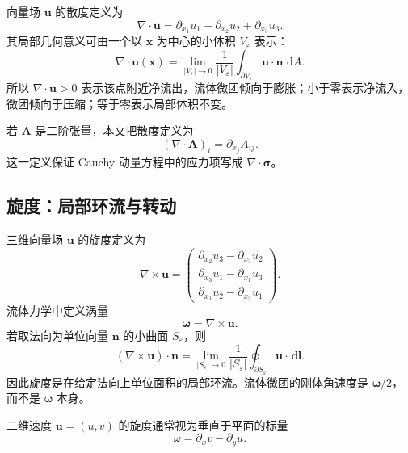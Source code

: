 \documentclass[cn,hazy,blue,11pt,normal]{elegantnote}
\numberwithin{equation}{section}
\newcommand{\dd}{\,\mathrm d}
\newcommand{\vct}[1]{\bm{#1}}
\newcommand{\ten}[1]{\bm{#1}}
\begin{document}
向量场 $\vct u$ 的散度定义为
\begin{equation}
 \boxed{\nabla\cdot\vct u
 =\partial_{x_1}u_1+\partial_{x_2}u_2+\partial_{x_3}u_3.}
\end{equation}
其局部几何意义可由一个以 $\vct x$ 为中心的小体积 $V_\varepsilon$ 表示：
\begin{equation}
 \nabla\cdot\vct u(\vct x)
 =\lim_{|V_\varepsilon|\to0}
 \frac1{|V_\varepsilon|}
 \int_{\partial V_\varepsilon}\vct u\cdot\vct n\,\dd A.
\end{equation}
所以 $\nabla\cdot\vct u>0$ 表示该点附近净流出，流体微团倾向于膨胀；小于零表示净流入，微团倾向于压缩；等于零表示局部体积不变。

若 $\ten A$ 是二阶张量，本文把散度定义为
\begin{equation}
 (\nabla\cdot\ten A)_i=\partial_{x_j}A_{ij}.
\end{equation}
这一定义保证 Cauchy 动量方程中的应力项写成 $\nabla\cdot\ten\sigma$。

\subsection{旋度：局部环流与转动}

三维向量场 $\vct u$ 的旋度定义为
\begin{equation}
 \boxed{
 \nabla\times\vct u=
 \begin{pmatrix}
 \partial_{x_2}u_3-\partial_{x_3}u_2\\
 \partial_{x_3}u_1-\partial_{x_1}u_3\\
 \partial_{x_1}u_2-\partial_{x_2}u_1
 \end{pmatrix}.}
\end{equation}
流体力学中定义涡量
\begin{equation}
 \vct\omega=\nabla\times\vct u.
\end{equation}
若取法向为单位向量 $\vct n$ 的小曲面 $S_\varepsilon$，则
\begin{equation}
 (\nabla\times\vct u)\cdot\vct n
 =\lim_{|S_\varepsilon|\to0}
 \frac1{|S_\varepsilon|}
 \oint_{\partial S_\varepsilon}\vct u\cdot\dd\vct l.
\end{equation}
因此旋度是在给定法向上单位面积的局部环流。流体微团的刚体角速度是 $\vct\omega/2$，而不是 $\vct\omega$ 本身。

二维速度 $\vct u=(u,v)$ 的旋度通常视为垂直于平面的标量
\begin{equation}
 \omega=\partial_xv-\partial_yu.
\end{equation}
\end{document}
